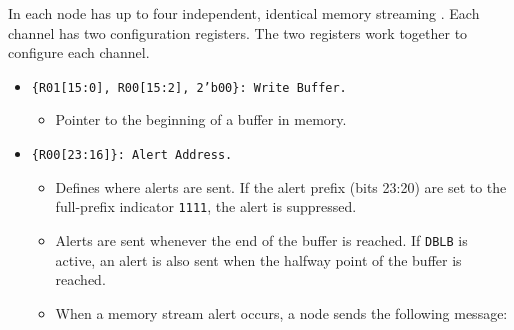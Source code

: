 In \proto each node has up to four independent, identical memory streaming
. Each channel has two configuration registers. The
two registers work together to configure each channel.

\begin{itemize}
  \item {\tt \{R01[15:0], R00[15:2], 2'b00\}: Write Buffer.}
    \begin{itemize}
      \item Pointer to the beginning of a buffer in memory.
    \end{itemize}
  \item {\tt \{R00[23:16]\}: Alert Address.}
    \begin{itemize}
      \item Defines where alerts are sent. If the alert prefix (bits 23:20)
        are set to the full-prefix indicator {\tt 1111}, the alert is
        suppressed.
      \item Alerts are sent whenever the end of the buffer is reached.  If
        {\tt DBLB} is active, an alert is also sent when the halfway point of
        the buffer is reached.
      \item When a memory stream alert occurs, a node sends the following
        message:


\end{itemize}
\end{itemize}
